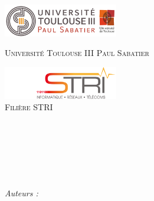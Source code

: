 %
\begin{titlepage}
    \begin{center}
        \begin{minipage}[t]{0.48\textwidth}
            \begin{flushleft}
                \includegraphics [width=50mm]{images/logo-univ.png}
                \\[0.7cm]
                \begin{spacing}{1.3}
                    \textsc{\LARGE Université Toulouse III Paul Sabatier}
                \end{spacing}
            \end{flushleft}
        \end{minipage}
        \begin{minipage}[t]{0.48\textwidth}
            \begin{flushright}
                \includegraphics [width=50mm]{images/logo-stri.png}
                \\[0.7cm]
                \textsc{\LARGE Filière STRI}
            \end{flushright}
        \end{minipage}
        \\[3.7cm]
        \textsc{\Large \reportsubject}\\[0.7cm]
        \HRule \\[0.7cm]
        {\huge \bfseries \reporttitle}\\[0.7cm]
        \HRule \\[8.5cm]
        \begin{flushleft} \large
            \emph{Auteurs :}\\
            \reportauthor
        \end{flushleft}
        \vfill
        {\large \reportdate}
    \end{center}
%
\end{titlepage}
